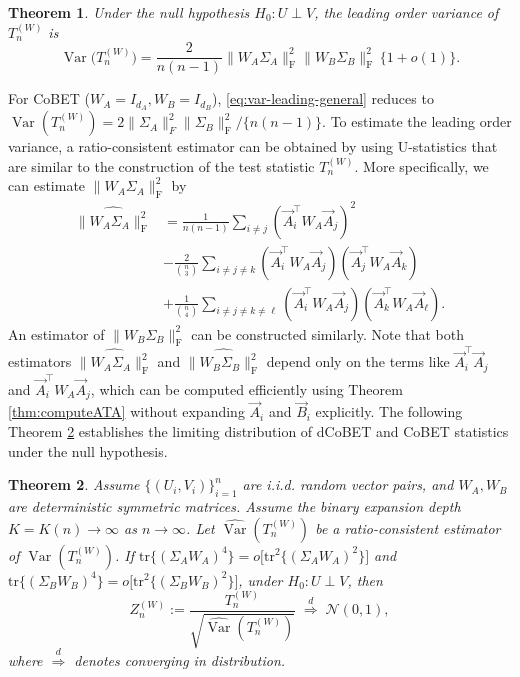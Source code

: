 \documentclass[12pt,reqno,oneside]{amsbook}
\newtheorem{theorem}{Theorem}[chapter]
\theoremstyle{definition}
\theoremstyle{remark}
\DeclareMathOperator{\Var}{Var}
\begin{document}
\begin{theorem}
\label{lem:leadingordervar} 
Under the null hypothesis $H_0: U\perp V$, the leading order variance of $T_n^{(W)}$ 
is
\begin{equation}
\label{eq:var-leading-general}
\Var\!\big(T_n^{(W)}\big)
= \frac{2}{n(n-1)}
  \|W_A\Sigma_A\|_{\mathrm F}^2
  \|W_B\Sigma_B\|_{\mathrm F}^2
  \,\{1+o(1)\}.
\end{equation}
\end{theorem} 
For CoBET ($W_A=I_{d_A}, W_B=I_{d_B}$), \eqref{eq:var-leading-general} reduces to 
$ \Var(T_{n}^{(W)}) = 2\|\Sigma_A\|_F^2\|\Sigma_B\|_{\mathrm F}^2/\{n(n-1)\} . $
To estimate the leading order variance, a ratio-consistent estimator can be obtained by 
using U-statistics that are similar to the construction of the test statistic
$T_n^{(W)}$. More specifically, we can estimate $\|W_A\Sigma_A\|_{\mathrm F}^2$ by
\begin{align*}
\widehat{\|W_A\Sigma_A\|_{\mathrm F}^2}
&= \frac{1}{n(n-1)}\sum_{i\ne j}
(\vec A_i^\top W_A \vec A_j)^2\\
&-\frac{2}{\binom{n}{3}}\sum_{i\ne j\ne k}
(\vec A_i^\top W_A \vec A_j)
(\vec A_j^\top W_A \vec A_k)\\
&+ \frac{1}{\binom{n}{4}}\sum_{i\ne j\ne k\ne\ell}
(\vec A_i^\top W_A \vec A_j)
(\vec A_k^\top W_A \vec A_\ell).
\end{align*}
An estimator of $\|W_B\Sigma_B\|_{\mathrm F}^2$ can be constructed similarly. %
Note that both estimators $\widehat{\|W_A\Sigma_A\|_{\mathrm F}^2}$ and $\widehat{\|W_B\Sigma_B\|_{\mathrm F}^2}$ depend
only on the terms like $\vec A_i^\top \vec A_j$ and $\vec A_i^\top W_A \vec A_j$,
which can be computed efficiently using Theorem \ref{thm:computeATA} without
expanding $\vec A_i$ and $\vec B_i$ explicitly.
The following Theorem \ref{thm:weighted-clt} establishes
the limiting distribution of dCoBET and CoBET statistics
under the null hypothesis.

\begin{theorem} 
\label{thm:weighted-clt}  Assume $\{(U_i,V_i)\}_{i=1}^n$ are i.i.d. random vector pairs, and $W_A, W_B$ are deterministic symmetric matrices. 
Assume the binary expansion depth $K=K(n)\to\infty$ as $n\to\infty$.
Let $\widehat{\Var}(T_n^{(W)})$ be a ratio-consistent estimator of $\Var(T_n^{(W)})$. If $\mbox{tr}\{(\Sigma_AW_A)^4\}=o\Big[\mbox{tr}^2\{(\Sigma_AW_A)^2\}\Big]$ and $\mbox{tr}\{(\Sigma_BW_B)^4\}=o\Big[\mbox{tr}^2\{(\Sigma_BW_B)^2\}\Big]$, under $H_0: U \perp V$, then
\[ Z_n^{(W)} := \frac{T_n^{(W)}}{\sqrt{\widehat{\Var}(T_n^{(W)})}} \;\stackrel{d}{\Rightarrow}\; \mathcal N(0,1),
\]
where $\stackrel{d}{\Rightarrow}$ denotes converging in distribution.
\end{theorem}
\end{document}
